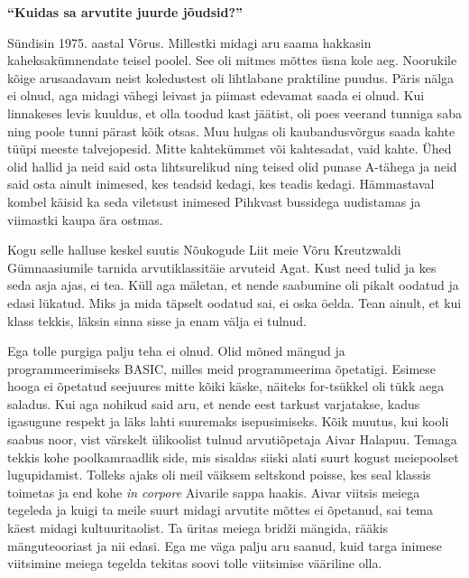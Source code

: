
\textbf{\enquote{Kuidas sa arvutite juurde jõudsid?}}

Sündisin 1975. aastal Võrus. Millestki midagi aru saama hakkasin 
kaheksakümnendate teisel poolel. See oli mitmes mõttes üsna kole 
aeg. Noorukile kõige arusaadavam neist koledustest oli lihtlabane praktiline 
puudus. Päris nälga ei olnud, aga midagi vähegi leivast ja piimast edevamat 
saada ei olnud. Kui linnakeses levis kuuldus, et olla toodud kast jäätist, oli 
poes veerand tunniga saba ning poole tunni pärast kõik otsas. Muu hulgas oli 
kaubandusvõrgus saada kahte tüüpi meeste talvejopesid. Mitte kahtekümmet või
kahtesadat, vaid kahte. Ühed olid hallid ja neid said osta lihtsurelikud ning teised olid punase A-tähega ja neid said osta 
ainult inimesed, kes teadsid kedagi, kes teadis kedagi. 
Hämmastaval kombel käisid ka seda viletsust inimesed Pihkvast bussidega 
uudistamas ja viimastki kaupa ära ostmas. 

Kogu selle halluse keskel suutis Nõukogude Liit meie Võru Kreutzwaldi 
Gümnaasiumile tarnida 
arvutiklassitäie arvuteid Agat. Kust need tulid ja kes 
seda asja ajas, ei tea. Küll aga mäletan, et nende saabumine oli pikalt oodatud 
ja edasi lükatud. Miks ja mida täpselt oodatud sai, ei oska öelda. Tean ainult, et 
kui klass tekkis, läksin sinna sisse ja enam välja ei tulnud. 

Ega tolle purgiga palju teha ei olnud. Olid mõned mängud ja programmeerimiseks 
BASIC, milles meid programmeerima õpetatigi. Esimese hooga ei õpetatud 
seejuures mitte kõiki käske, näiteks for-tsükkel oli tükk aega saladus. Kui aga 
nohikud said aru, et nende eest tarkust varjatakse, kadus igasugune respekt ja 
läks lahti suuremaks isepusimiseks. Kõik muutus, kui kooli saabus noor, vist
värskelt ülikoolist tulnud arvutiõpetaja Aivar 
Halapuu. Temaga tekkis kohe 
poolkamraadlik side, mis sisaldas siiski alati suurt kogust meiepoolset lugupidamist. Tolleks ajaks oli meil väiksem seltskond poisse, kes seal 
klassis toimetas ja end kohe \emph{in corpore} Aivarile sappa haakis. Aivar 
viitsis meiega tegeleda ja kuigi ta meile suurt midagi arvutite mõttes ei 
õpetanud, sai tema käest midagi kultuuritaolist. Ta
üritas meiega bridži mängida, rääkis mänguteooriast ja nii edasi. Ega me väga palju aru saanud, kuid targa inimese viitsimine meiega tegelda tekitas soovi
tolle viitsimise vääriline olla.

